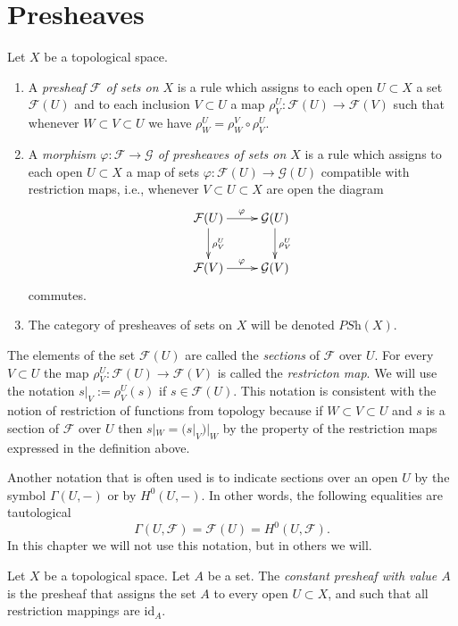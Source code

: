 \section{Presheaves}
\label{section-presheaves}


\begin{definition}
\label{definition-presheaf}
Let $X$ be a topological space.
\begin{enumerate}
\item A {\it presheaf $\mathcal{F}$ of sets on $X$} is a rule which
assigns to each open $U \subset X$ a set $\mathcal{F}(U)$ and
to each inclusion $V \subset U$ a map
$\rho^U_V : \mathcal{F}(U) \to \mathcal{F}(V)$ such that
whenever $W \subset V \subset U$ we have 
$\rho^U_W = \rho^V_W \circ \rho ^U_V$.
\item A {\it morphism $\varphi : \mathcal{F} \to \mathcal{G}$ 
of presheaves of sets on $X$} is a rule which assigns to each
open $U \subset X$ a map of sets $\varphi : \mathcal{F}(U)
\to \mathcal{G}(U)$ compatible with restriction maps,
i.e., whenever $V \subset U \subset X$ are open the
diagram
$$
\xymatrix{
\mathcal{F}(U) \ar[r]^\varphi \ar[d]^{\rho^U_V} &
\mathcal{G}(U) \ar[d]^{\rho^U_V} \cr
\mathcal{F}(V) \ar[r]^\varphi & \mathcal{G}(V)
}
$$
commutes.
\item The category of presheaves of sets on $X$ will be denoted
$\textit{PSh}(X)$.
\end{enumerate}
\end{definition}

\noindent
The elements of the set $\mathcal{F}(U)$ are called
the {\it sections} of $\mathcal{F}$ over $U$.
For every $V \subset U$ the map
$\rho^U_V : \mathcal{F}(U) \to \mathcal{F}(V)$
is called the {\it restricton map}. We will use the
notation $s|_V := \rho^U_V(s)$ if $s\in \mathcal{F}(U)$.
This notation is consistent with the notion of restriction
of functions from topology because if $W \subset V \subset U$
and $s$ is a section of $\mathcal{F}$ over $U$ then
$s|_W = (s|_V)|_W$ by the property of the restriction maps
expressed in the definition above.

\medskip\noindent
Another notation that is often used is to indicate sections
over an open $U$ by the symbol $\Gamma(U, -)$ or by
$H^0(U, -)$. In other words, the following equalities
are tautological
$$
\Gamma(U, \mathcal{F}) = \mathcal{F}(U) = H^0(U, \mathcal{F}).
$$
In this chapter we will not use this notation, but in others
we will.

\begin{definition}
\label{definition-constant-presheaf}
Let $X$ be a topological space. Let $A$ be a set.
The {\it constant presheaf with value $A$} is the
presheaf that assigns the set $A$ to every open
$U \subset X$, and such that all restriction mappings
are $\text{id}_A$.
\end{definition}

